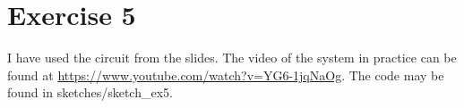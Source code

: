 \part*{Exercise 5}
I have used the circuit from the slides. The video of the system in practice can be found at \url{https://www.youtube.com/watch?v=YG6-1jqNaOg}. The code may be found in sketches/sketch\_ex5.